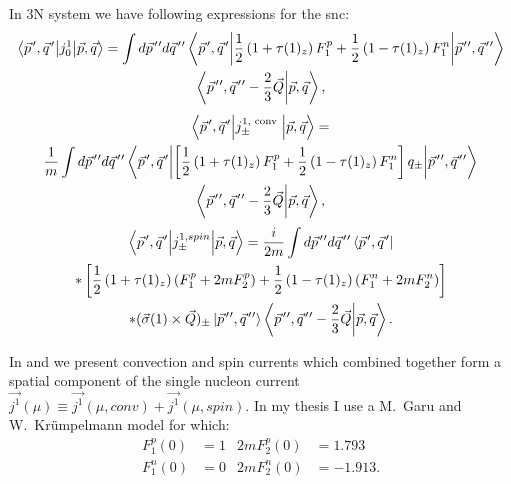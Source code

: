     In 3N system we have following expressions for the \gls{snc}:
    \begin{multline}
        \matrixel**{\pvec{p}, \pvec{q}}{j_0^1}{\vec{p}, \vec{q}} 
         =\int d \ppvec{p} d \ppvec{q}
        \matrixel**{\pvec{p}, \pvec{q}}{\frac{1}{2}\left(1+\tau(1)_z\right) F_1^p+\frac{1}{2}\left(1-\tau(1)_z\right) F_1^n}{\ppvec{p}, \ppvec{q}}\\
        \braket{\ppvec{p}, \ppvec{q}-\frac{2}{3} \vec{Q}}{\vec{p}, \vec{q}},
    \end{multline}
    \begin{multline}
        \matrixel**{\pvec{p}, \pvec{q}}{j_{ \pm}^{1, \text { conv }}} {\vec{p}, \vec{q}} =\\
         \frac{1}{m} \int d \ppvec{p} d \ppvec{q}
        \matrixel**{\pvec{p}, \pvec{q}}{\left[\frac{1}{2}\left(1+\tau(1)_z\right) F_1^p+\frac{1}{2}\left(1-\tau(1)_z\right) F_1^n \right] q_{ \pm}}
        {\ppvec{p}, \ppvec{q}}\\
        \braket{\ppvec{p}, \ppvec{q}-\frac{2}{3} \vec{Q}}{\vec{p}, \vec{q}},
        \label{3n_conv}
    \end{multline}
    \begin{multline}
            \matrixel**{\pvec{p}, \pvec{q}}{j_{ \pm}^{1, spin}}{\vec{p}, \vec{q}} 
             =\frac{i}{2 m} \int d \ppvec{p} d \ppvec{q}
            \bra{\pvec{p}, \pvec{q}}\\
             *\left[\frac{1}{2}\left(1+\tau(1)_z\right)\left(F_1^p+2 m F_2^p\right)+\frac{1}{2}\left(1-\tau(1)_z\right)\left(F_1^n+2 m F_2^n\right)\right]  \\
             *(\vec{\sigma}(1) \times \vec{Q})_{ \pm}\ket{\ppvec{p}, \ppvec{q}}\braket{\ppvec{p}, \ppvec{q}-\frac{2}{3} \vec{Q}}{\vec{p}, \vec{q}} .
            \label{3n_spin}
    \end{multline}

    In  and  we present convection and spin currents which combined 
    together form a spatial component of the 
    single nucleon current $\vec{j^1}(\mu) \equiv \vec{j^1}(\mu, conv) + \vec{j^1}(\mu, spin)$. 
    In my thesis I use a M.~Garu and W.~Kr\"umpelmann model  \cite{GARI198610} for which:
    \begin{align}
            F_1^p(0)&=1 & 2 m F_2^p(0)&=1.793 \\
            F_1^n(0)&=0 & 2 m F_2^n(0)&=-1.913.
    \end{align}


